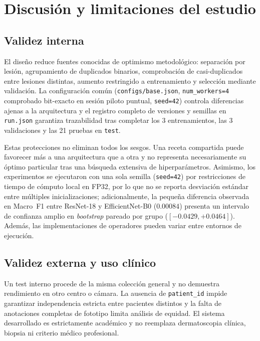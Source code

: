 \FloatBarrier\section{Discusión y limitaciones del estudio}

\subsection{Validez interna}
El diseño reduce fuentes conocidas de optimismo metodológico: separación por lesión, agrupamiento de duplicados binarios, comprobación de casi-duplicados entre lesiones distintas, aumento restringido a entrenamiento y selección mediante validación. La configuración común (\texttt{configs/base.json}, \texttt{num\_workers=4} comprobado bit-exacto en sesión piloto puntual, \texttt{seed=42}) controla diferencias ajenas a la arquitectura y el registro completo de versiones y semillas en \texttt{run.json} garantiza trazabilidad tras completar los 3 entrenamientos, las 3 validaciones y las 21 pruebas en \texttt{test}.

Estas protecciones no eliminan todos los sesgos. Una receta compartida puede favorecer más a una arquitectura que a otra y no representa necesariamente su óptimo particular tras una búsqueda extensiva de hiperparámetros. Asimismo, los experimentos se ejecutaron con una sola semilla (\texttt{seed=42}) por restricciones de tiempo de cómputo local en FP32, por lo que no se reporta desviación estándar entre múltiples inicializaciones; adicionalmente, la pequeña diferencia observada en Macro~F1 entre ResNet-18 y EfficientNet-B0 ($0.00084$) presenta un intervalo de confianza amplio en \textit{bootstrap} pareado por grupo ($[-0.0429, +0.0464]$). Además, las implementaciones de operadores pueden variar entre entornos de ejecución.

\subsection{Validez externa y uso clínico}
Un test interno procede de la misma colección general y no demuestra rendimiento en otro centro o cámara. La ausencia de \texttt{patient\_id} impide garantizar independencia estricta entre pacientes distintos y la falta de anotaciones completas de fototipo limita análisis de equidad. El sistema desarrollado es estrictamente académico y no reemplaza dermatoscopia clínica, biopsia ni criterio médico profesional.

